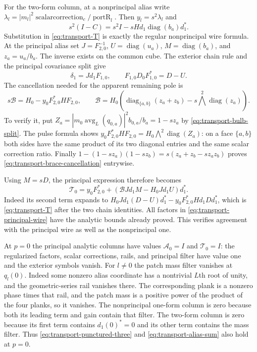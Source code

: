 For the two-form column, at a nonprincipal alias write
$\lambda_l=|m_l|^2\operatorname{scalar correction}_c/\operatorname{portR}_l$.
Then $y_l=s^2\lambda_l$ and
\[
 s^2(I-C)=s^2I-sHd_1\operatorname{diag}(b_a)d_1^*.
\]
Substitution in \eqref{eq:transport-T} is exactly the regular
nonprincipal wire formula. At the principal alias set
$J=F_{2,0}^{-1}$, $U=\operatorname{diag}(u_a)$,
$M=\operatorname{diag}(b_a)$, and $z_a=u_a/b_a$.
The inverse exists on the common cube. The exterior chain rule
and the principal covariance split give
\[
 \delta_1=Jd_1F_{1,0},\qquad
 F_{1,0}D_0F_{1,0}^*=D-U.
\]
The cancellation needed for the apparent remaining pole is
\begin{equation}\label{eq:transport-brace-cancellation}
 s\mathcal B=H_0-y_0F_{2,0}^*HF_{2,0},\qquad
 \mathcal B=H_0\left(\operatorname{diag}_{\{a,b\}}(z_a+z_b)
                                  -s\bigwedge^2\operatorname{diag}(z_a)\right).
\end{equation}
To verify it, put
$Z_a=|m_0\operatorname{avg}_L(q_{0,a})|^2b_{0,a}/b_a
=1-sz_a$ by \eqref{eq:transport-bulb-split}.
The pulse formula shows
$y_0F_{2,0}^*HF_{2,0}=H_0\bigwedge^2\operatorname{diag}(Z_a)$:
on a face $\{a,b\}$ both sides have the same product of its two
diagonal entries and the same scalar correction ratio.
Finally $1-(1-sz_a)(1-sz_b)=s(z_a+z_b-sz_az_b)$ proves
\eqref{eq:transport-brace-cancellation} entrywise.

Using $M=sD$, the principal expression therefore becomes
\begin{equation}\label{eq:transport-principal-wire}
 \mathcal T_0=y_0F_{2,0}^*
               +(\mathcal B Jd_1M-H_0Jd_1U)d_1^*.
\end{equation}
Indeed its second term expands to
$H_0Jd_1(D-U)d_1^*-y_0F_{2,0}^*Hd_1Dd_1^*$,
which is \eqref{eq:transport-T} after the two chain identities.
All factors in \eqref{eq:transport-principal-wire} have the
analytic bounds already proved. This verifies agreement with the
principal wire as well as the nonprincipal one.

At $p=0$ the principal analytic columns have values
$\mathcal A_0=I$ and $\mathcal T_0=I$: the regularized factors, scalar corrections,
rails, and principal filter have value one and the exterior
symbols vanish. For $l\ne0$ the patch mass filter vanishes at
$q_l(0)$. Indeed some nonzero alias coordinate has a nontrivial
$L$th root of unity, and the geometric-series rail vanishes
there. The corresponding plank is a nonzero phase times that rail, and
the patch mass is a positive power of the product of the four planks, so
it vanishes. The nonprincipal one-form column is zero because both
its leading term and gain contain that filter. The two-form
column is zero because its first term contains $d_1(0)^*=0$
and its other term contains the mass filter. Thus
\eqref{eq:transport-punctured-three} and
\eqref{eq:transport-alias-sum} also hold at $p=0$.


